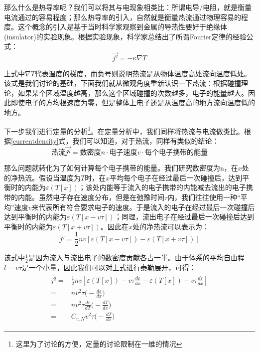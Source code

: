 \documentclass{ctexart}
\begin{document}
                那么什么是热导率呢？我们可以将其与电现象相类比：所谓电导/电阻，就是衡量电流通过的容易程度；那么热导率的引入，自然就是衡量热流通过物理容易的程度。这个概念的引入是基于当时科学家观察到金属的导热性要好于绝缘体(insulator)的实验现象。根据实验现象，科学家总结出了所谓Fourier定律的经验公式：
                \begin{equation}
                    \vec{j^q}=-\kappa\nabla T
                \end{equation}
                
                上式中$\nabla T$代表温度的梯度，而负号则说明热流是从物体温度高处流向温度低处。该式是我们讨论的基础，下面我们就从微观角度重新认识一下热流：根据碰撞理论，如果某个区域温度越高，那么这个区域碰撞的次数越多，电子的能量越大。因此即使电子的方均根速度为零，但是整体上电子还是从温度高的地方流向温度低的地方。
                
                下一步我们进行定量的分析\footnote{这里为了讨论的方便，定量的讨论限制在一维的情况}。在定量分析中，我们同样将热流与电流做类比。根据\eqref{currentdensity}式，我们可以知道，对于热流，同样有类似的结论：
                \begin{equation}
                    \text{热流}\vec{j^q}=\text{数密度}n\cdot \text{电子速度}v \cdot \text{每个电子携带的能量}
                \end{equation}
                
                那么问题就转化为了如何计算每个电子携带的能量。我们研究数密度为n，在$x$处的净热流。假设当温度为$T$时，在$x$平均每个电子在经过最后一次碰撞后，达到平衡时的内能为$\varepsilon(T[x])$；该处内能等于流入的电子携带的内能减去流出的电子携带的内能。虽然电子存在速度分布，但是在弛豫时间$\tau$内，我们往往使用一种“平均”速度$v$来代表所有符合要求电子的速度。于是流入的电子在经过最后一次碰撞后达到平衡时的内能为$\varepsilon(T[x-v\tau])$；同理，流出电子在经过最后一次碰撞后达到平衡时的内能为$\varepsilon(T[x+v\tau])$。因此在$x$处的净热流可以表示为：
                \begin{equation}
                    j^q=\frac{1}{2}nv[\varepsilon(T[x-v\tau])-\varepsilon(T[x+v\tau])]
                \end{equation}
                
                该式中$\frac{1}{2}$是因为流入与流出电子的数密度贡献各占一半。由于体系的平均自由程$l=v\tau$是一个小量，因此我们可以对上式进行泰勒展开，可得：
                \begin{align}
                    \begin{split}
                        j^q=&\frac{1}{2}nv[\varepsilon(T[x])-v\tau \frac{d\varepsilon}{dx}-\varepsilon(T[x])-v\tau\frac{d\varepsilon}{dx}]\\
                        =&nv^2\tau\Big(-\frac{d\varepsilon}{dx}\Big)\\
                        =&nv^2\tau\frac{d\varepsilon}{dT}\Big(-\frac{dT}{dx}\Big)\\
                        =&C_{v,N}v^2\tau\Big(-\frac{dT}{dx}\Big)
                    \end{split}
                \end{align}
                    
\end{document}
